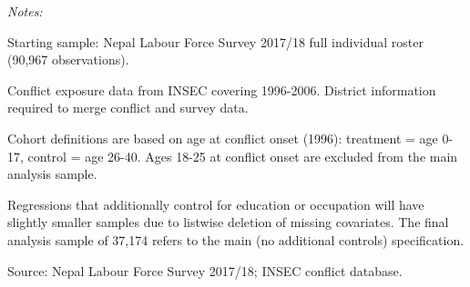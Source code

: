 \begin{table}[!h]
{\begin{threeparttable}
\begin{tabular}[t]{lrrl}
\bottomrule
\end{tabular}
\begin{tablenotes}
\item \textit{Notes:} 
\item Starting sample: Nepal Labour Force Survey 2017/18 full individual roster (90,967 observations).
\item Conflict exposure data from INSEC covering 1996-2006. District information required to merge conflict and survey data.
\item Cohort definitions are based on age at conflict onset (1996): treatment = age 0-17, control = age 26-40. Ages 18-25 at conflict onset are excluded from the main analysis sample.
\item Regressions that additionally control for education or occupation will have slightly smaller samples due to listwise deletion of missing covariates. The final analysis sample of 37,174 refers to the main (no additional controls) specification.
\item Source: Nepal Labour Force Survey 2017/18; INSEC conflict database.
\end{tablenotes}
\end{threeparttable}}
\end{table}
